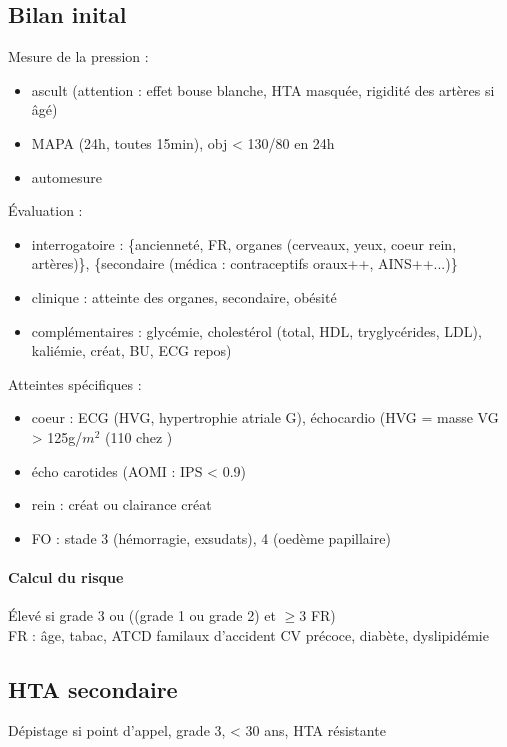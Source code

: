 \subsection{Bilan inital}
Mesure de la pression : 
\begin{itemize}
  \item ascult (attention : effet bouse blanche, HTA masquée, rigidité des
    artères si âgé)
  \item MAPA (24h, toutes 15min), obj < 130/80 en 24h
  \item automesure 
\end{itemize}
Évaluation :
\begin{itemize}
  \item interrogatoire : \{ancienneté, FR, organes (cerveaux, yeux, coeur rein,
    artères)\}, \{secondaire (médica : contraceptifs oraux++, AINS++...)\}
  \item clinique : atteinte des organes, secondaire, obésité
  \item complémentaires : glycémie, cholestérol (total, HDL, tryglycérides, LDL),
kaliémie, créat, BU, ECG repos)
\end{itemize}
Atteintes spécifiques :
\begin{itemize}
  \item coeur : ECG (HVG, hypertrophie atriale G), échocardio (HVG = masse VG >
    125g/$m^2$ (110 chez \female)
  \item écho carotides (AOMI : IPS < 0.9)
  \item rein : \inc créat ou \dec clairance créat
  \item FO : stade 3 (hémorragie, exsudats), 4 (oedème papillaire)
\end{itemize}

\paragraph{Calcul du risque}
Élevé si grade 3 ou ((grade 1 ou grade 2) et $\ge 3$ FR)\\
FR : âge, tabac, ATCD familaux d'accident CV précoce, diabète, dyslipidémie

\subsection{HTA secondaire}
Dépistage si point d'appel, grade 3, < 30 ans, HTA résistante

